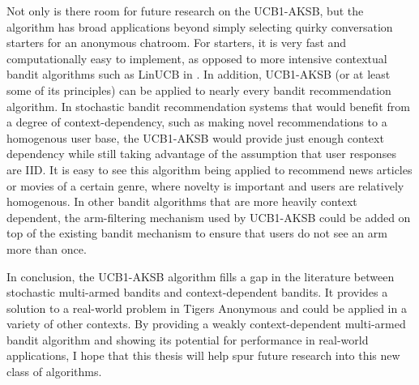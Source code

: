Not only is there room for future research on the UCB1-AKSB, but the algorithm has broad applications beyond simply selecting quirky conversation starters for an anonymous chatroom. For starters, it is very fast and computationally easy to implement, as opposed to more intensive contextual bandit algorithms such as LinUCB in \citet{chu10}. In addition, UCB1-AKSB (or at least some of its principles) can be applied to nearly every bandit recommendation algorithm. In stochastic bandit recommendation systems that would benefit from a degree of context-dependency, such as making novel recommendations to a homogenous user base, the UCB1-AKSB would provide just enough context dependency while still taking advantage of the assumption that user responses are IID. It is easy to see this algorithm being applied to recommend news articles or movies of a certain genre, where novelty is important and users are relatively homogenous. In other bandit algorithms that are more heavily context dependent, the arm-filtering mechanism used by UCB1-AKSB could be added on top of the existing bandit mechanism to ensure that users do not see an arm more than once.

In conclusion, the UCB1-AKSB algorithm fills a gap in the literature between stochastic multi-armed bandits and context-dependent bandits. It provides a solution to a real-world problem in Tigers Anonymous and could be applied in a variety of other contexts. By providing a weakly context-dependent multi-armed bandit algorithm and showing its potential for performance in real-world applications, I hope that this thesis will help spur future research into this new class of algorithms.
